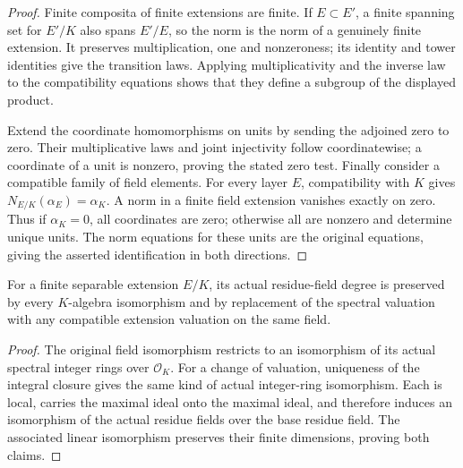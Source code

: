 \begin{proof}
Finite composita of finite extensions are finite. If $E\subset E'$,
a finite spanning set for $E'/K$ also spans $E'/E$, so the norm is
the norm of a genuinely finite extension. It preserves multiplication,
one and nonzeroness; its identity and tower identities give the
transition laws. Applying multiplicativity and the inverse law to
the compatibility equations shows that they define a subgroup of
the displayed product.

Extend the coordinate homomorphisms on units by sending the adjoined
zero to zero. Their multiplicative laws and joint injectivity follow
coordinatewise; a coordinate of a unit is nonzero, proving the stated
zero test. Finally consider a compatible family of field elements.
For every layer $E$, compatibility with $K$ gives
$N_{E/K}(\alpha_E)=\alpha_K$. A norm in a finite field extension
vanishes exactly on zero. Thus if $\alpha_K=0$, all coordinates
are zero; otherwise all are nonzero and determine unique units.
The norm equations for these units are the original equations,
giving the asserted identification in both directions.
\end{proof}

\begin{lemma}
\label{fw:finite-extension-residue-invariance}
\leanok
For a finite separable extension $E/K$, its actual residue-field
degree is preserved by every $K$-algebra isomorphism and by
replacement of the spectral valuation with any compatible
extension valuation on the same field.
\end{lemma}
\begin{proof}
The original field isomorphism restricts to an isomorphism of
its actual spectral integer rings over $\mathcal O_K$.
For a change of valuation, uniqueness of the integral closure
gives the same kind of actual integer-ring isomorphism.
Each is local, carries the maximal ideal onto the maximal ideal,
and therefore induces an isomorphism of the actual residue
fields over the base residue field. The associated linear
isomorphism preserves their finite dimensions, proving both
claims.
\end{proof}

